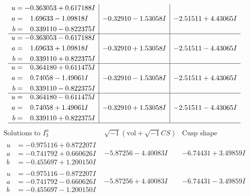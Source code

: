 \documentclass[1p]{elsarticle_modified}
\theoremstyle{definition}
\newcommand{\I}{\sqrt{-1}}
\begin{document}
$$\begin{array}{c|c|c}
\begin{aligned}
u &= -0.363053 + 0.617188 I \\
a &= \phantom{-}1.69633 - 1.09818 I \\
b &= \phantom{-}0.339110 - 0.822375 I\end{aligned}
 & -0.32910 - 1.53058 I & -2.51511 + 4.43065 I \\ \hline\begin{aligned}
u &= -0.363053 - 0.617188 I \\
a &= \phantom{-}1.69633 + 1.09818 I \\
b &= \phantom{-}0.339110 + 0.822375 I\end{aligned}
 & -0.32910 + 1.53058 I & -2.51511 - 4.43065 I \\ \hline\begin{aligned}
u &= \phantom{-}0.364180 + 0.611475 I \\
a &= \phantom{-}0.74058 - 1.49061 I \\
b &= \phantom{-}0.339110 - 0.822375 I\end{aligned}
 & -0.32910 - 1.53058 I & -2.51511 + 4.43065 I \\ \hline\begin{aligned}
u &= \phantom{-}0.364180 - 0.611475 I \\
a &= \phantom{-}0.74058 + 1.49061 I \\
b &= \phantom{-}0.339110 + 0.822375 I\end{aligned}
 & -0.32910 + 1.53058 I & -2.51511 - 4.43065 I\\
 \hline 
 \end{array}$$\newpage$$\begin{array}{c|c|c}  
\text{Solutions to }I^u_{3}& \I (\text{vol} + \sqrt{-1}CS) & \text{Cusp shape}\\
 \hline 
\begin{aligned}
u &= -0.975116 + 0.872207 I \\
a &= -0.741792 + 0.660626 I \\
b &= -0.455697 + 1.200150 I\end{aligned}
 & -5.87256 - 4.40083 I & -6.74431 + 3.49859 I \\ \hline\begin{aligned}
u &= -0.975116 - 0.872207 I \\
a &= -0.741792 - 0.660626 I \\
b &= -0.455697 - 1.200150 I\end{aligned}
 & -5.87256 + 4.40083 I & -6.74431 - 3.49859 I \\ \hline\begin{aligned}

\end{aligned}
\end{array}$$
\end{document}
